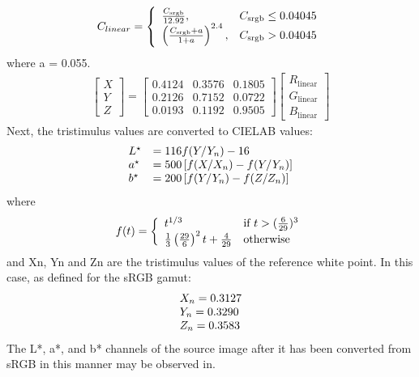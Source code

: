 \begin{eqnarray}
C_{linear} = \left\{
  \begin{array}{l l}
  	\frac{C_\mathrm{srgb}}{12.92}, & C_\mathrm{srgb}\le0.04045\\
	\left(\frac{C_\mathrm{srgb}+a}{1+a}\right)^{2.4}, & C_\mathrm{srgb}>0.04045
  \end{array} \right. 
\end{eqnarray}
where a = 0.055.
\begin{eqnarray}
\begin{bmatrix}
X\\Y\\Z\end{bmatrix}=
\begin{bmatrix}
0.4124&0.3576&0.1805\\
0.2126&0.7152&0.0722\\
0.0193&0.1192&0.9505
\end{bmatrix}
\begin{bmatrix}
R_\mathrm{linear}\\ 
G_\mathrm{linear}\\ 
B_\mathrm{linear}
\end{bmatrix}
\end{eqnarray}
Next, the tristimulus values are converted to CIELAB values:
\begin{eqnarray}
\left.
  \begin{array}{l l}
   L^\star & = 116 f(Y/Y_n) - 16\\
   a^\star & = 500 \left[f(X/X_n) - f(Y/Y_n)\right]\\
   b^\star & = 200 \left[f(Y/Y_n) - f(Z/Z_n)\right]
  \end{array} \right. 
\end{eqnarray}
where 
\begin{eqnarray}
f(t) = \left\{
  \begin{array}{l l}
  t^{1/3} & \text{if } t > (\frac{6}{29})^3 \\
  \frac13 \left( \frac{29}{6} \right)^2 t + \frac{4}{29} & \text{otherwise}
\end{array} \right. 
\end{eqnarray}
and Xn, Yn and Zn are the tristimulus values of the reference white point.  In this case, as defined for the sRGB gamut:
\begin{eqnarray}
\begin{array}{l l}
X_{n} = 0.3127\\
Y_{n} = 0.3290\\
Z_{n} = 0.3583
\end{array}
\end{eqnarray}
The L*, a*, and b* channels of the source image after it has been converted from sRGB in this manner may be observed in.

